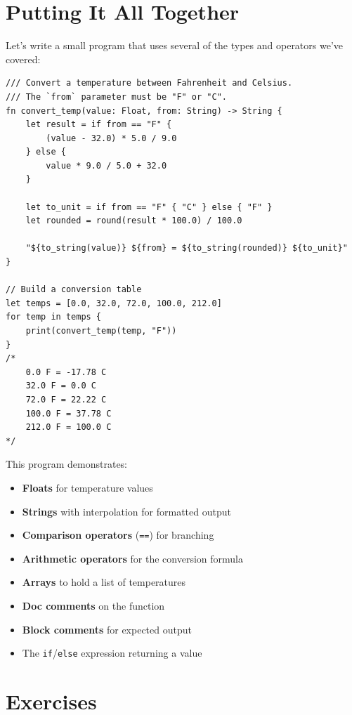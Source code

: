 \section{Putting It All Together}\label{sec:types-together}

Let's write a small program that uses several of the types and operators we've covered:

\begin{lstlisting}[language=Lattice, caption={A temperature converter using multiple types}]
/// Convert a temperature between Fahrenheit and Celsius.
/// The `from` parameter must be "F" or "C".
fn convert_temp(value: Float, from: String) -> String {
    let result = if from == "F" {
        (value - 32.0) * 5.0 / 9.0
    } else {
        value * 9.0 / 5.0 + 32.0
    }

    let to_unit = if from == "F" { "C" } else { "F" }
    let rounded = round(result * 100.0) / 100.0

    "${to_string(value)} ${from} = ${to_string(rounded)} ${to_unit}"
}

// Build a conversion table
let temps = [0.0, 32.0, 72.0, 100.0, 212.0]
for temp in temps {
    print(convert_temp(temp, "F"))
}
/*
    0.0 F = -17.78 C
    32.0 F = 0.0 C
    72.0 F = 22.22 C
    100.0 F = 37.78 C
    212.0 F = 100.0 C
*/
\end{lstlisting}

This program demonstrates:
\begin{itemize}
  \item \textbf{Floats} for temperature values
  \item \textbf{Strings} with interpolation for formatted output
  \item \textbf{Comparison operators} (\lstinline|==|) for branching
  \item \textbf{Arithmetic operators} for the conversion formula
  \item \textbf{Arrays} to hold a list of temperatures
  \item \textbf{Doc comments} on the function
  \item \textbf{Block comments} for expected output
  \item The \lstinline|if|/\lstinline|else| expression returning a value
\end{itemize}

\section{Exercises}\label{sec:ch03-exercises}

